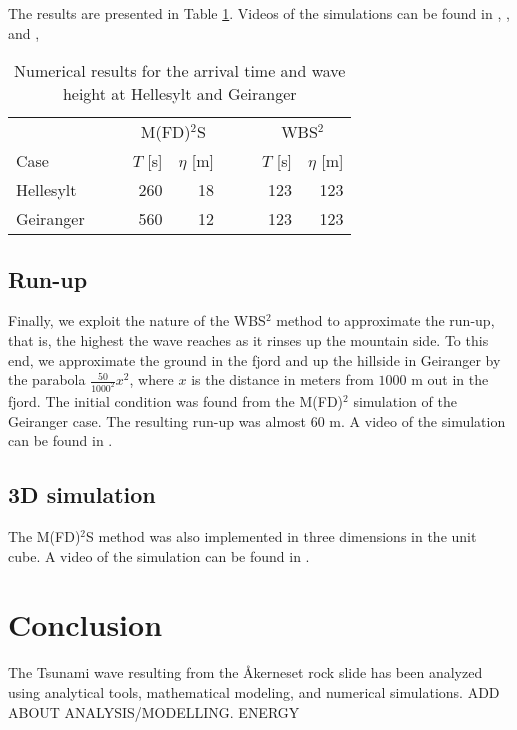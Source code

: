 \documentclass[11pt]{article}
\begin{document}
The results are presented in Table \ref{tab:TimeHeight}. Videos of the simulations can be found in \cite{hellesyltMFDFD}, \cite{hellesyltWBSS}, \cite{geriangerWBSS} and \cite{geirangerMFDFD},
\begin{table}[H]
	\begin{center}
	    \begin{tabular}{l r r r r r r}
	                     &    $\quad$    &    \multicolumn{2}{c}{M(FD)$^2$S}    &    $\quad$    &    \multicolumn{2}{c}{WBS$^2$}      \\
	        Case         &               &    $T$ [s]    &    $\eta$ [m]        &               &    $T$ [s]    &    $\eta$ [m]    \\
            \hline                                                                               
            Hellesylt    &               &    260        &    18                &               &    123        &    123               \\
            Geiranger    &               &    560        &    12                &               &    123        &        123               \\
	    \end{tabular}
	\end{center}
	\caption{Numerical results for the arrival time and wave height at Hellesylt and Geiranger}
	\label{tab:TimeHeight}
\end{table}
\subsection{Run-up}
Finally, we exploit the nature of the WBS$^2$ method to approximate the run-up, that is, the highest the wave reaches as it rinses up the mountain side. To this end, we
approximate the ground in the fjord and up the hillside in Geiranger by the parabola $\frac{50}{1000^2}x^2$, where $x$ is the distance in meters from $1000$ m out in the fjord. The initial condition was found from the
M(FD)$^2$ simulation of the Geiranger case.
The resulting run-up was almost 60 m. A video of the simulation can be found in \cite{geirangerUnUpWBS}.    
\subsection{3D simulation}
The M(FD)$^2$S method was also implemented in three dimensions in the unit cube. A video of the simulation
can be found in \cite{MFDFD3dExample}.
%
%
\section{Conclusion}
The Tsunami wave resulting from the Åkerneset rock slide has been analyzed using analytical tools, mathematical modeling, and numerical simulations. ADD ABOUT ANALYSIS/MODELLING. ENERGY
\end{document}
